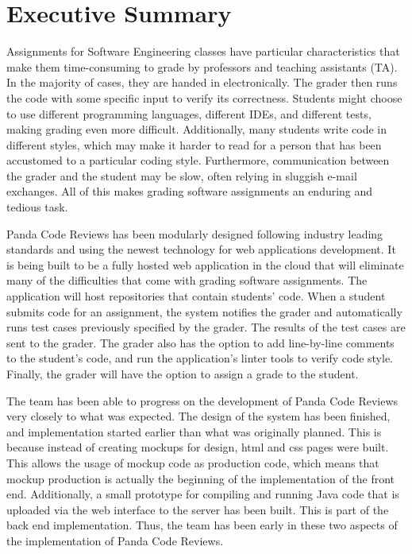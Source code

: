 \part*{Executive Summary}






Assignments for Software Engineering classes have particular characteristics
that make them time-consuming to grade by professors and teaching assistants
(TA). In the majority of cases, they are handed in electronically. The grader
then runs the code with some specific input to verify its correctness. Students
might choose to use different programming languages, different IDEs, and
different tests, making grading even more difficult. Additionally, many students
write code in different styles, which may make it harder to read for a person
that has been accustomed to a particular coding style. Furthermore,
communication between the grader and the student may be slow, often relying in
sluggish e-mail exchanges. All of this makes grading software assignments an
enduring and tedious task.

Panda Code Reviews has been modularly designed following industry leading
standards and using the newest technology for web applications development. It
is being built to be a fully hosted web application in the cloud that will
eliminate many of the difficulties that come with grading software assignments.
The application will host repositories that contain students' code. When a
student submits code for an assignment, the system notifies the grader and
automatically runs test cases previously specified by the grader. The results of
the test cases are sent to the grader. The grader also has the option to add
line-by-line comments to the student's code, and run the application's linter
tools to verify code style. Finally, the grader will have the option to assign a
grade to the student.

The team has been able to progress on the development of Panda Code Reviews very
closely to what was expected. The design of the system has been finished, and
implementation started earlier than what was originally planned. This is because
instead of creating mockups for design, html and css pages were built. This
allows the usage of mockup code as production code, which means that mockup
production is actually the beginning of the implementation of the front end.
Additionally, a small prototype for compiling and running Java code that is
uploaded via the web interface to the server has been built. This is part of the
back end implementation. Thus, the team has been early in these two aspects of
the implementation of Panda Code Reviews.

